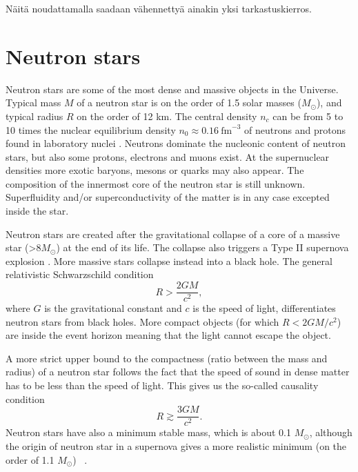 \documentclass{wihuri}
\def\be{\begin{equation}}
\def\ee{\end{equation}}
\begin{document}
Näitä noudattamalla saadaan vähennettyä ainakin yksi tarkastuskierros.

\fi

\section{Neutron stars}


Neutron stars are some of the most dense and massive objects in the
Universe. Typical mass $M$ of a neutron star is on the order of 1.5 solar masses ($M_{\odot}$), and typical radius $R$ on the order of 12 km. The central density $n_{c}$ can be from 5 to 10 times the nuclear equilibrium density $n_{0} \approx 0.16 ~\mathrm{fm}^{-3}$ of neutrons and protons found in laboratory nuclei \cite{lattimer}. Neutrons dominate the nucleonic content of neutron stars, but also some protons, electrons and muons exist. At the supernuclear densities more exotic baryons, mesons or quarks may also appear. The composition of the innermost core of the neutron star is still unknown. Superfluidity and/or superconductivity of the matter %
is in any case excepted inside the star. 

 
Neutron stars are created after the gravitational collapse of a core of a
massive star (>8$M_{\odot}$) at the end of its life. The collapse also triggers a Type II supernova explosion \cite{lattimer}. More massive stars collapse instead into a black hole. The general relativistic Schwarzschild condition 
\be \label{eq:schw_cond}
 R > \frac{2GM}{c^{2}},
\ee 
where $G$ is the gravitational constant and $c$ is the speed of light, %
differentiates neutron stars from black holes. More compact objects (for which $R < 2GM/c^{2}$) are inside the event horizon meaning that the light cannot escape the object.


A more strict upper bound to the compactness (ratio between the mass and radius) of a neutron star follows
the fact \cite{rhoades} %
that the speed of sound in dense matter has to be less than the speed of light. This gives us the so-called causality condition
\be \label{eq:causality}
 R \gtrsim \frac{3GM}{c^{2}}.
\ee 
Neutron stars have also a minimum stable mass, which is about 0.1 $M_{\odot}$, although the origin of neutron star in a supernova gives a more realistic minimum (on the order of 1.1 $M_{\odot}$) ~\cite{lattimer2013}.
\end{document}
